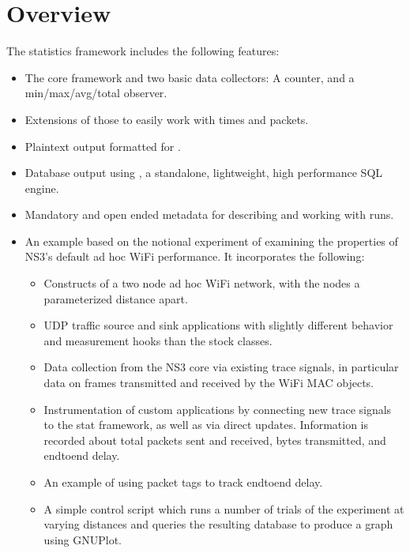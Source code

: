 \documentclass[letterpaper,10pt,english]{sphinxmanual}
\begin{document}
\section{Overview}
\label{\detokenize{statistics:overview}}
The statistics framework includes the following features:
\begin{itemize}
\item {} 
The core framework and two basic data collectors: A counter, and a min/max/avg/total observer.

\item {} 
Extensions of those to easily work with times and packets.

\item {} 
Plaintext output formatted for .

\item {} 
Database output using , a standalone, lightweight, high performance SQL engine.

\item {} 
Mandatory and open ended metadata for describing and working with runs.

\item {} 
An example based on the notional experiment of examining the properties of NS\sphinxhyphen{}3’s default ad hoc WiFi performance.  It incorporates the following:
\begin{itemize}
\item {} 
Constructs of a two node ad hoc WiFi network, with the nodes a parameterized distance apart.

\item {} 
UDP traffic source and sink applications with slightly different behavior and measurement hooks than the stock classes.

\item {} 
Data collection from the NS\sphinxhyphen{}3 core via existing trace signals, in particular data on frames transmitted and received by the WiFi MAC objects.

\item {} 
Instrumentation of custom applications by connecting new trace signals to the stat framework, as well as via direct updates.  Information is recorded about total packets sent and received, bytes transmitted, and end\sphinxhyphen{}to\sphinxhyphen{}end delay.

\item {} 
An example of using packet tags to track end\sphinxhyphen{}to\sphinxhyphen{}end delay.

\item {} 
A simple control script which runs a number of trials of the experiment at varying distances and queries the resulting database to produce a graph using GNUPlot.

\end{itemize}

\end{itemize}
\end{document}
